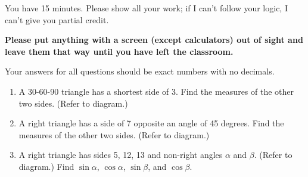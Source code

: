 \documentclass{handout}
\begin{document}
\maketitle

You have 15 minutes. Please show all your work; if I can't follow your logic, I can't give you partial credit.

\textbf{Please put anything with a screen (except calculators) out of sight and leave them that way until you have left the classroom.}

Your answers for all questions should be exact numbers with no decimals.

\begin{enumerate}
  \item A 30-60-90 triangle has a shortest side of 3. Find the measures of the other two sides. (Refer to diagram.)
  \item A right triangle has a side of 7 opposite an angle of 45 degrees. Find the measures of the other two sides. (Refer to diagram.) 
  \item A right triangle has sides 5, 12, 13 and non-right angles \(\alpha\) and \(\beta.\) (Refer to diagram.) Find \(\sin \alpha\), \(\cos \alpha\), \(\sin \beta\), and \(\cos \beta.\)
\end{enumerate}
\end{document}
